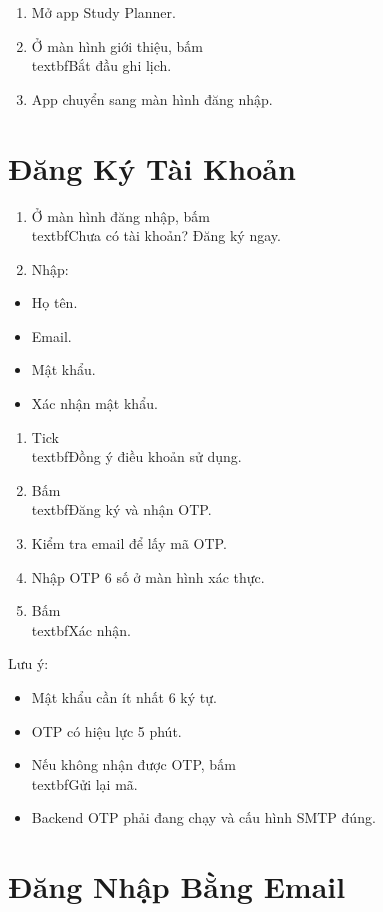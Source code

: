 \documentclass[12pt,a4paper]{report}
\begin{document}
\begin{enumerate}
\item Mở app Study Planner.
\item Ở màn hình giới thiệu, bấm \\textbf{Bắt đầu ghi lịch}.
\item App chuyển sang màn hình đăng nhập.
\end{enumerate}

\section{Đăng Ký Tài Khoản}

\begin{enumerate}
\item Ở màn hình đăng nhập, bấm \\textbf{Chưa có tài khoản? Đăng ký ngay}.
\item Nhập:
\end{enumerate}
\begin{itemize}
\item Họ tên.
\item Email.
\item Mật khẩu.
\item Xác nhận mật khẩu.
\end{itemize}
\begin{enumerate}
\item Tick \\textbf{Đồng ý điều khoản sử dụng}.
\item Bấm \\textbf{Đăng ký và nhận OTP}.
\item Kiểm tra email để lấy mã OTP.
\item Nhập OTP 6 số ở màn hình xác thực.
\item Bấm \\textbf{Xác nhận}.
\end{enumerate}

Lưu ý:

\begin{itemize}
\item Mật khẩu cần ít nhất 6 ký tự.
\item OTP có hiệu lực 5 phút.
\item Nếu không nhận được OTP, bấm \\textbf{Gửi lại mã}.
\item Backend OTP phải đang chạy và cấu hình SMTP đúng.
\end{itemize}

\section{Đăng Nhập Bằng Email}
\end{document}
